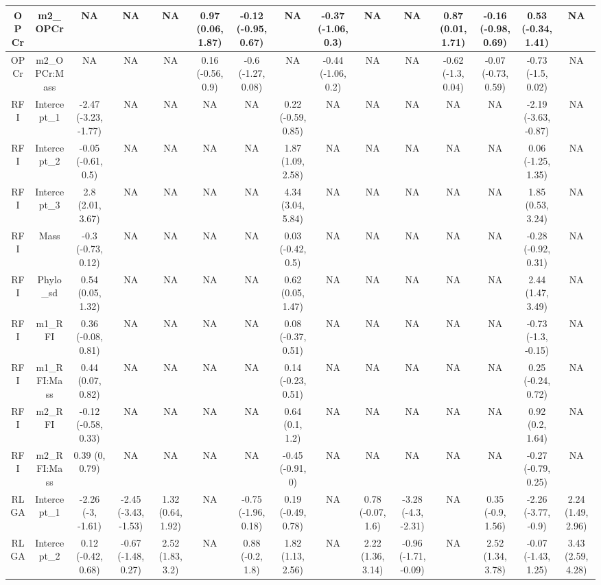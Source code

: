 \begin{longtable}[t]{c|c|c|c|c|c|c|c|c|c|c|c|c|c|c}
\hline
OPCr & m2_OPCr & NA & NA & NA & 0.97 (0.06, 1.87) & -0.12 (-0.95, 0.67) & NA & -0.37 (-1.06, 0.3) & NA & NA & 0.87 (0.01, 1.71) & -0.16 (-0.98, 0.69) & 0.53 (-0.34, 1.41) & NA\\
\hline
OPCr & m2_OPCr:Mass & NA & NA & NA & 0.16 (-0.56, 0.9) & -0.6 (-1.27, 0.08) & NA & -0.44 (-1.06, 0.2) & NA & NA & -0.62 (-1.3, 0.04) & -0.07 (-0.73, 0.59) & -0.73 (-1.5, 0.02) & NA\\
\hline
RFI & Intercept_1 & -2.47 (-3.23, -1.77) & NA & NA & NA & NA & 0.22 (-0.59, 0.85) & NA & NA & NA & NA & NA & -2.19 (-3.63, -0.87) & NA\\
\hline
RFI & Intercept_2 & -0.05 (-0.61, 0.5) & NA & NA & NA & NA & 1.87 (1.09, 2.58) & NA & NA & NA & NA & NA & 0.06 (-1.25, 1.35) & NA\\
\hline
RFI & Intercept_3 & 2.8 (2.01, 3.67) & NA & NA & NA & NA & 4.34 (3.04, 5.84) & NA & NA & NA & NA & NA & 1.85 (0.53, 3.24) & NA\\
\hline
RFI & Mass & -0.3 (-0.73, 0.12) & NA & NA & NA & NA & 0.03 (-0.42, 0.5) & NA & NA & NA & NA & NA & -0.28 (-0.92, 0.31) & NA\\
\hline
RFI & Phylo_sd & 0.54 (0.05, 1.32) & NA & NA & NA & NA & 0.62 (0.05, 1.47) & NA & NA & NA & NA & NA & 2.44 (1.47, 3.49) & NA\\
\hline
RFI & m1_RFI & 0.36 (-0.08, 0.81) & NA & NA & NA & NA & 0.08 (-0.37, 0.51) & NA & NA & NA & NA & NA & -0.73 (-1.3, -0.15) & NA\\
\hline
RFI & m1_RFI:Mass & 0.44 (0.07, 0.82) & NA & NA & NA & NA & 0.14 (-0.23, 0.51) & NA & NA & NA & NA & NA & 0.25 (-0.24, 0.72) & NA\\
\hline
RFI & m2_RFI & -0.12 (-0.58, 0.33) & NA & NA & NA & NA & 0.64 (0.1, 1.2) & NA & NA & NA & NA & NA & 0.92 (0.2, 1.64) & NA\\
\hline
RFI & m2_RFI:Mass & 0.39 (0, 0.79) & NA & NA & NA & NA & -0.45 (-0.91, 0) & NA & NA & NA & NA & NA & -0.27 (-0.79, 0.25) & NA\\
\hline
RLGA & Intercept_1 & -2.26 (-3, -1.61) & -2.45 (-3.43, -1.53) & 1.32 (0.64, 1.92) & NA & -0.75 (-1.96, 0.18) & 0.19 (-0.49, 0.78) & NA & 0.78 (-0.07, 1.6) & -3.28 (-4.3, -2.31) & NA & 0.35 (-0.9, 1.56) & -2.26 (-3.77, -0.9) & 2.24 (1.49, 2.96)\\
\hline
RLGA & Intercept_2 & 0.12 (-0.42, 0.68) & -0.67 (-1.48, 0.27) & 2.52 (1.83, 3.2) & NA & 0.88 (-0.2, 1.8) & 1.82 (1.13, 2.56) & NA & 2.22 (1.36, 3.14) & -0.96 (-1.71, -0.09) & NA & 2.52 (1.34, 3.78) & -0.07 (-1.43, 1.25) & 3.43 (2.59, 4.28)\\

\end{longtable}
